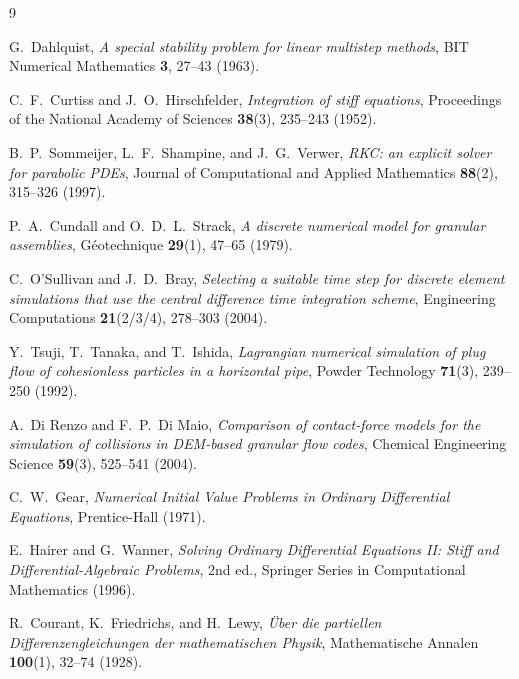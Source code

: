 \documentclass[11pt]{article}
\begin{document}
\begin{thebibliography}{9}

G.~Dahlquist,
\emph{A special stability problem for linear multistep methods},
BIT Numerical Mathematics \textbf{3}, 27--43 (1963).

C.~F.~Curtiss and J.~O.~Hirschfelder,
\emph{Integration of stiff equations},
Proceedings of the National Academy of Sciences \textbf{38}(3), 235--243 (1952).

B.~P.~Sommeijer, L.~F.~Shampine, and J.~G.~Verwer,
\emph{RKC: an explicit solver for parabolic PDEs},
Journal of Computational and Applied Mathematics \textbf{88}(2), 315--326 (1997).

P.~A.~Cundall and O.~D.~L.~Strack,
\emph{A discrete numerical model for granular assemblies},
G\'{e}otechnique \textbf{29}(1), 47--65 (1979).

C.~O'Sullivan and J.~D.~Bray,
\emph{Selecting a suitable time step for discrete element simulations that use the central
difference time integration scheme},
Engineering Computations \textbf{21}(2/3/4), 278--303 (2004).

Y.~Tsuji, T.~Tanaka, and T.~Ishida,
\emph{Lagrangian numerical simulation of plug flow of cohesionless particles in a
horizontal pipe},
Powder Technology \textbf{71}(3), 239--250 (1992).

A.~Di Renzo and F.~P.~Di Maio,
\emph{Comparison of contact-force models for the simulation of collisions in
DEM-based granular flow codes},
Chemical Engineering Science \textbf{59}(3), 525--541 (2004).

C.~W.~Gear,
\emph{Numerical Initial Value Problems in Ordinary Differential Equations},
Prentice-Hall (1971).

E.~Hairer and G.~Wanner,
\emph{Solving Ordinary Differential Equations II: Stiff and Differential-Algebraic
Problems}, 2nd ed., Springer Series in Computational Mathematics (1996).

R.~Courant, K.~Friedrichs, and H.~Lewy,
\emph{\"Uber die partiellen Differenzengleichungen der mathematischen Physik},
Mathematische Annalen \textbf{100}(1), 32--74 (1928).

\end{thebibliography}
\end{document}
